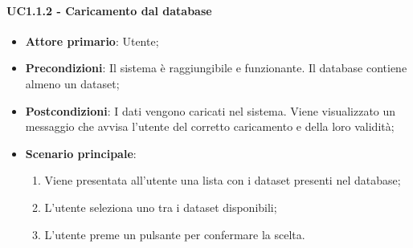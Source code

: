 \paragraph{UC1.1.2 - Caricamento dal database}
\begin{itemize}
	\item \textbf{Attore primario}: Utente;
	\item \textbf{Precondizioni}: Il sistema è raggiungibile e funzionante. Il database contiene almeno un dataset;
	\item \textbf{Postcondizioni}: I dati vengono caricati nel sistema. Viene visualizzato un messaggio che avvisa l'utente del corretto caricamento e della loro validità;
	\item \textbf{Scenario principale}: 
	\begin{enumerate}
			\item Viene presentata all'utente una lista con i dataset presenti nel database;
			\item L'utente seleziona uno tra i dataset disponibili;
			\item L'utente preme un pulsante per confermare la scelta.
		\end{enumerate}
	
\end{itemize}